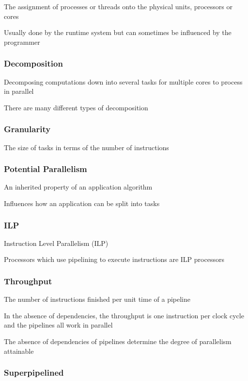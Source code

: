 \documentclass{article}
\begin{document}
The assignment of processes or threads onto the physical units, processors or cores

Usually done by the runtime system but can sometimes be influenced by the programmer

\subsubsection{Decomposition}

Decomposing computations down into several tasks for multiple cores to process in parallel

There are many different types of decomposition

\subsubsection{Granularity}

The size of tasks in terms of the number of instructions

\subsubsection{Potential Parallelism}

An inherited property of an application algorithm

Influences how an application can be split into tasks

\subsubsection{ILP}

Instruction Level Parallelism (ILP)

Processors which use pipelining to execute instructions are ILP processors

\subsubsection{Throughput}

The number of instructions finished per unit time of a pipeline

In the absence of dependencies, the throughput is one instruction per clock cycle and the pipelines all work in parallel

The absence of dependencies of pipelines determine the degree of parallelism attainable

\subsubsection{Superpipelined}
\end{document}
